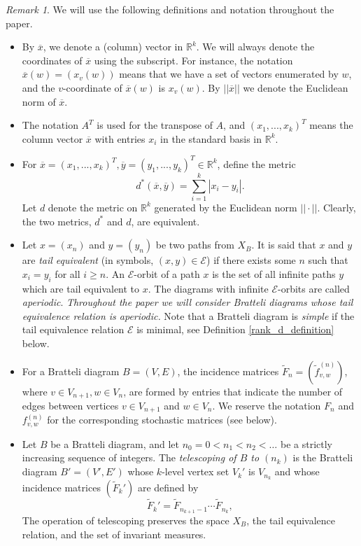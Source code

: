 \documentclass[11pt, english, reqno]{amsart}
\theoremstyle{definition}
\theoremstyle{remark}
\newtheorem{remark}[defin]{Remark}
\theoremstyle{plain}
\def\ov{\overline}
\def\tl{\widetilde}
\numberwithin{equation}{section}
\begin{document}
\begin{remark}\label{defin_and_notat} We will use the following definitions and notation
 throughout  the  paper.
\begin{itemize}

\item By $\ov x$, we denote a (column) vector in
$\mathbb{R}^{k}$. We will always denote the coordinates of $\ov x$ using
 the subscript.
For instance, the notation $\ov x(w) = (x_v(w)) $ means that we have a
set of vectors
 enumerated by $w$, and the $v$-coordinate of  $\ov x(w) $ is $x_v(w)$.
By $||\ov x||$ we  denote the Euclidean norm of $\ov x$.

\item The notation $A^T$ is used for the transpose of $A$, and
$(x_1, ... , x_k)^T$ means the column vector $\ov x$ with entries
 $x_i$ in the standard basis in $\mathbb R^k$.

\item For $\ov x = (x_1, ... , x_k)^T, \ov y = (y_1, ... , y_k)^T \in
\mathbb{R}^k$, define the metric
$$
d^*(\ov x, \ov y) = \sum_{i = 1}^k |x_i - y_i|.
$$
Let $d$ denote the metric on $\mathbb R^k$ generated by the Euclidean
norm $||\cdot||$. Clearly, the two metrics, $d^*$ and $d$, are equivalent.

\item Let $x =(x_n)$ and $y =(y_n)$  be two paths from $X_B$. It is
 said that $x$ and $y$ are {\em tail equivalent} (in symbols,  $(x,y)
  \in   \mathcal E$)  if there exists some $n$ such that $x_i = y_i$ for
   all  $i\geq n$.  An $\mathcal E$-orbit of a path $x$ is the set of all infinite paths $y$ which are tail equivalent to $x$.
   The diagrams with infinite $\mathcal E$-orbits are
    called {\em aperiodic}.  { \it Throughout the paper we will consider Bratteli diagrams whose tail equivalence relation is aperiodic.}
    Note that a Bratteli diagram is \textit{simple}
    if the  tail equivalence relation   $\mathcal E$ is minimal, see Definition
    \ref{rank_d_definition} below.

\item For a Bratteli diagram  $B = (V,E)$,  the incidence matrices $\tl
 F_n   = (\tl  f_{v,w}^{(n)})$, where  $v \in V_{n+1}, w \in V_n$, are
  formed by
  entries that indicate the number of edges between vertices $v \in
   V_{n+1}$ and $ w \in V_n$. We reserve the notation $F_n$ and
   $ f_{v,w}^{(n)}$ for the    corresponding stochastic matrices (see
    below).

\item
Let $B$ be a Bratteli diagram, and let $n_0 = 0 < n_1< n_2 < \ldots$
be a strictly increasing sequence of integers. The {\em telescoping of
 $B$ to $ (n_k)$} is the Bratteli diagram $B' = (V', E')$ whose $k$-level
vertex  set $V_k'$ is  $V_{n_k}$ and whose incidence matrices $(\tl F_k')$
 are defined by
   \[
   \tl F_k'= \tl F_{n_{k+1}-1} \cdots \tl F_{n_k},
   \]
The operation of telescoping preserves the space $X_B$,
the tail equivalence relation, and the set of invariant measures.


\end{itemize}
\end{remark}
\end{document}
